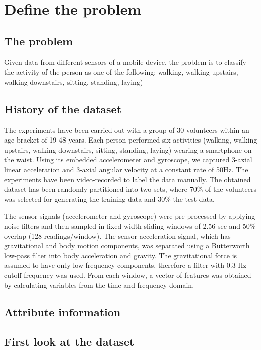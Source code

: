 \chapter{Define the problem}

\section{The problem}
Given data from different sensors of a mobile device, the problem is to classify the activity of the person as one of the following: walking, walking upstairs, walking downstairs, sitting, standing, laying)

\section{History of the dataset}
The experiments have been carried out with a group of 30
volunteers within an age bracket of 19-48 years. Each
person performed six activities (walking, walking upstairs, walking downstairs, sitting, standing, laying) wearing a smartphone on the
waist. Using its embedded accelerometer and gyroscope, we
captured 3-axial linear acceleration and 3-axial angular
velocity at a constant rate of 50Hz. The experiments have
been video-recorded to label the data manually. The
obtained dataset has been randomly partitioned into two
sets, where 70\% of the volunteers was selected for
generating the training data and 30\% the test data. 

The sensor signals (accelerometer and gyroscope) were
pre-processed by applying noise filters and then sampled
in fixed-width sliding windows of 2.56 sec and 50\%
overlap (128 readings/window). The sensor acceleration
signal, which has gravitational and body motion
components, was separated using a Butterworth low-pass
filter into body acceleration and gravity. The
gravitational force is assumed to have only low frequency
components, therefore a filter with 0.3 Hz cutoff
frequency was used. From each window, a vector of features
was obtained by calculating variables from the time and
frequency domain. \cite{uci-link}

\section{Attribute information}
\section{First look at the dataset}

